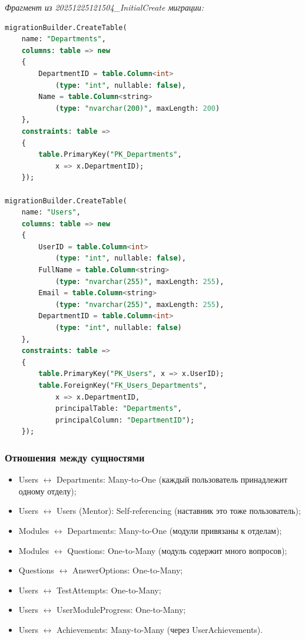 \textit{Фрагмент из 20251225121504\_InitialCreate миграции:}
\begin{lstlisting}[language=SQL, basicstyle=\ttfamily\small]
migrationBuilder.CreateTable(
    name: "Departments",
    columns: table => new
    {
        DepartmentID = table.Column<int>
            (type: "int", nullable: false),
        Name = table.Column<string>
            (type: "nvarchar(200)", maxLength: 200)
    },
    constraints: table =>
    {
        table.PrimaryKey("PK_Departments", 
            x => x.DepartmentID);
    });

migrationBuilder.CreateTable(
    name: "Users",
    columns: table => new
    {
        UserID = table.Column<int>
            (type: "int", nullable: false),
        FullName = table.Column<string>
            (type: "nvarchar(255)", maxLength: 255),
        Email = table.Column<string>
            (type: "nvarchar(255)", maxLength: 255),
        DepartmentID = table.Column<int>
            (type: "int", nullable: false)
    },
    constraints: table =>
    {
        table.PrimaryKey("PK_Users", x => x.UserID);
        table.ForeignKey("FK_Users_Departments",
            x => x.DepartmentID,
            principalTable: "Departments",
            principalColumn: "DepartmentID");
    });
\end{lstlisting}

\subsubsection{Отношения между сущностями}

\begin{itemize}
    \item Users $\leftrightarrow$ Departments: Many-to-One (каждый пользователь принадлежит одному отделу);
    \item Users $\leftrightarrow$ Users (Mentor): Self-referencing (наставник это тоже пользователь);
    \item Modules $\leftrightarrow$ Departments: Many-to-One (модули привязаны к отделам);
    \item Modules $\leftrightarrow$ Questions: One-to-Many (модуль содержит много вопросов);
    \item Questions $\leftrightarrow$ AnswerOptions: One-to-Many;
    \item Users $\leftrightarrow$ TestAttempts: One-to-Many;
    \item Users $\leftrightarrow$ UserModuleProgress: One-to-Many;
    \item Users $\leftrightarrow$ Achievements: Many-to-Many (через UserAchievements).

\end{itemize}


